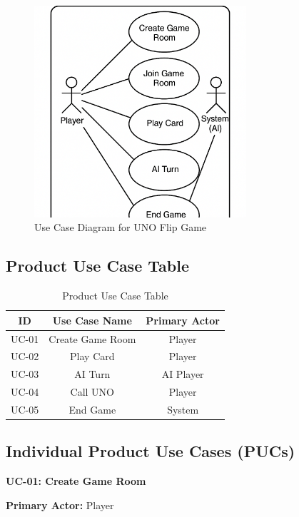 \documentclass[12pt]{article}
\begin{document}
\begin{figure}[H]
\centering
\includegraphics[width=0.7\textwidth]{PUC_diagram.png}
\caption{Use Case Diagram for UNO Flip Game}
\label{fig:usecase-diagram}
\end{figure}

\subsection{Product Use Case Table}

\begin{table}[H]
\centering
\label{tab:puc-table}
\begin{tabular}{|c|c|c|}
\hline
\textbf{ID} & \textbf{Use Case Name} & \textbf{Primary Actor} \\
\hline
UC-01 & Create Game Room & Player \\
UC-02 & Play Card & Player \\
UC-03 & AI Turn & AI Player \\
UC-04 & Call UNO & Player \\
UC-05 & End Game & System \\
\hline
\end{tabular}
\caption{Product Use Case Table}
\end{table}

\subsection{Individual Product Use Cases (PUCs)}

\textbf{UC-01: Create Game Room}

\textbf{Primary Actor:} Player
\end{document}
